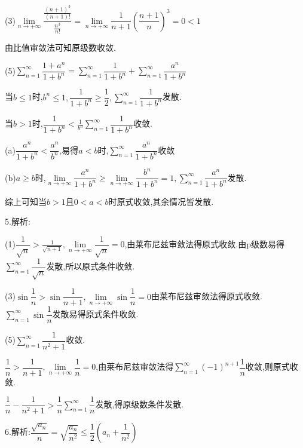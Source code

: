 (3)$\lim\limits_{n \to +\infty} \dfrac{{\frac{{{{(n + 1)}^3}}}{{(n + 1)!}}}}{{\frac{{{n^3}}}{{n!}}}} = \lim\limits_{n \to +\infty} \dfrac{1}{{n + 1}}{\left( {\dfrac{{n + 1}}{n}} \right)^3} = 0 < 1$

由比值审敛法可知原级数收敛.

(5)$\sum\limits_{n = 1}^\infty  {\dfrac{{1 + {a^n}}}{{1 + {b^n}}}}  = \sum\limits_{n = 1}^\infty  {\dfrac{1}{{1 + {b^n}}}}  + \sum\limits_{n = 1}^\infty  {\dfrac{{{a^n}}}{{1 + {b^n}}}} $

当$b \leqslant 1$时,${b^n} \leqslant 1,\dfrac{1}{{1 + {b^n}}} \geqslant \dfrac{1}{2},\sum\limits_{n = 1}^\infty  {\dfrac{1}{{1 + {b^n}}}} $发散.

当$b > 1$时,$\dfrac{1}{{1 + {b^n}}} < \frac{1}{{{b^n}}}\sum\limits_{n = 1}^\infty  {\dfrac{1}{{1 + {b^n}}}} $收敛.

(a)$\dfrac{{{a^n}}}{{1 + {b^n}}} < \dfrac{{{a^n}}}{{{b^n}}}$,易得$a < b$时,$\sum\limits_{n = 1}^\infty  {\dfrac{{{a^n}}}{{1 + {b^n}}}} $收敛

(b)$a \geqslant b$时,$\lim\limits_{n \to +\infty} \dfrac{{{a^n}}}{{1 + {b^n}}} \geqslant \lim\limits_{n \to +\infty} \dfrac{{{b^n}}}{{1 + {b^n}}} = 1,\sum\limits_{n = 1}^\infty  {\dfrac{{{a^n}}}{{1 + {b^n}}}} $发散.

综上可知当$b > 1$且$0 < a < b$时原式收敛,其余情况皆发散.

5.解析:

(1)$\dfrac{1}{{\sqrt n }} > \frac{1}{{\sqrt {n + 1} }},\lim\limits_{n \to +\infty} \dfrac{1}{{\sqrt n }} = 0$,由莱布尼兹审敛法得原式收敛.由p级数易得$\sum\limits_{n = 1}^\infty  {\dfrac{1}{{\sqrt n }}} $发散,所以原式条件收敛.

(3)$\sin \dfrac{1}{n} > \sin \dfrac{1}{{n + 1}},\lim\limits_{n \to +\infty} \sin \dfrac{1}{n} = 0$由莱布尼兹审敛法得原式收敛.$\sum\limits_{n = 1}^\infty  {\sin \dfrac{1}{n}} $发散易得原式条件收敛.

(5)$\sum\limits_{n = 1}^\infty  {\dfrac{1}{{{n^2} + 1}}} $收敛.

$\dfrac{1}{n} > \dfrac{1}{{n + 1}},\lim\limits_{n \to +\infty} \dfrac{1}{n} = 0$,由莱布尼兹审敛法得$\sum\limits_{n = 1}^\infty  {{{( - 1)}^{n + 1}}\dfrac{1}{n}} $收敛,则原式收敛.

$\dfrac{1}{n} - \dfrac{1}{{{n^2} + 1}} > \dfrac{1}{n}\sum\limits_{n = 1}^\infty  {\dfrac{1}{n}} $发散,得原级数条件发散.

6.解析:$\dfrac{{\sqrt {{a_n}} }}{n} = \sqrt {\dfrac{{{a_n}}}{{{n^2}}}}  \leqslant \dfrac{1}{2}({a_n} + \dfrac{1}{{{n^2}}})$

